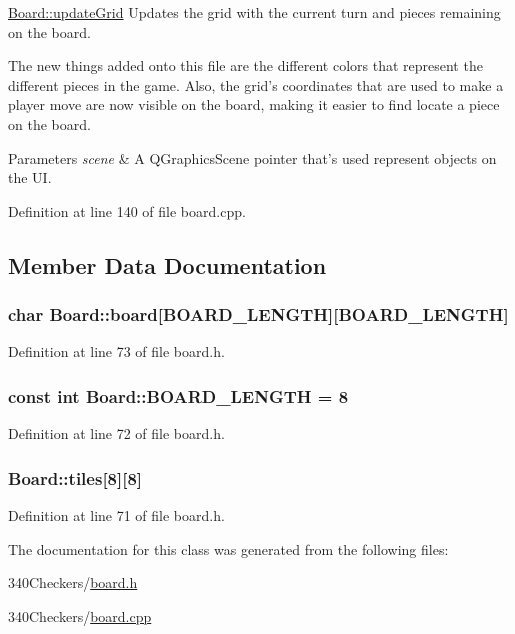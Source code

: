 \hyperlink{class_board_a964d67ddc797487f1a018e4c7cd82075}{Board\-::update\-Grid} Updates the grid with the current turn and pieces remaining on the board. 

The new things added onto this file are the different colors that represent the different pieces in the game. Also, the grid's coordinates that are used to make a player move are now visible on the board, making it easier to find locate a piece on the board. 
\begin{DoxyParams}{Parameters}
{\em scene} & A Q\-Graphics\-Scene pointer that's used represent objects on the U\-I. \\
\hline
\end{DoxyParams}


Definition at line 140 of file board.\-cpp.



\subsection{Member Data Documentation}
\hypertarget{class_board_a6e32218e7d8adc57f9d414836d135d96}{
\subsubsection[{board}]{\setlength{\rightskip}{0pt plus 5cm}char Board\-::board\mbox{[}{\bf B\-O\-A\-R\-D\-\_\-\-L\-E\-N\-G\-T\-H}\mbox{]}\mbox{[}{\bf B\-O\-A\-R\-D\-\_\-\-L\-E\-N\-G\-T\-H}\mbox{]}}}\label{class_board_a6e32218e7d8adc57f9d414836d135d96}


Definition at line 73 of file board.\-h.

\hypertarget{class_board_a3b3d4827430812c8849610301dbf91f3}{
\subsubsection[{B\-O\-A\-R\-D\-\_\-\-L\-E\-N\-G\-T\-H}]{\setlength{\rightskip}{0pt plus 5cm}const int Board\-::\-B\-O\-A\-R\-D\-\_\-\-L\-E\-N\-G\-T\-H = 8\hspace{0.3cm}{\ttfamily [static]}}}\label{class_board_a3b3d4827430812c8849610301dbf91f3}


Definition at line 72 of file board.\-h.

\hypertarget{class_board_acd3e1340f25b2d2371d8a2862e473b15}{
\subsubsection[{tiles}]{ Board\-::tiles\mbox{[}8\mbox{]}\mbox{[}8\mbox{]}}}\label{class_board_acd3e1340f25b2d2371d8a2862e473b15}


Definition at line 71 of file board.\-h.



The documentation for this class was generated from the following files\-:\begin{DoxyCompactItemize}
\item 
340\-Checkers/\hyperlink{board_8h}{board.\-h}\item 
340\-Checkers/\hyperlink{board_8cpp}{board.\-cpp}\end{DoxyCompactItemize}
